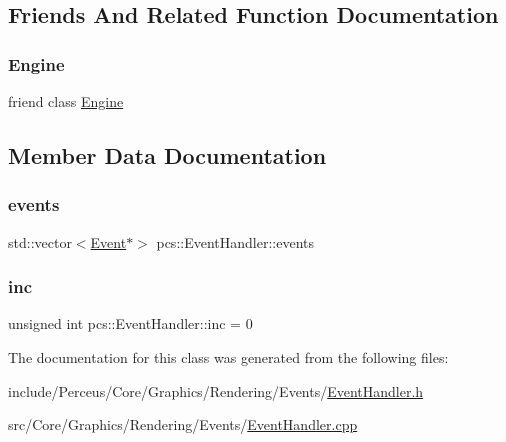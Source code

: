\subsection{Friends And Related Function Documentation}
\mbox{\label{classpcs_1_1EventHandler_a3e1914489e4bed4f9f23cdeab34a43dc}} 
\subsubsection{\texorpdfstring{Engine}{Engine}}
{\footnotesize\ttfamily friend class \hyperlink{classpcs_1_1Engine}{Engine}\hspace{0.3cm}{\ttfamily [friend]}}



\subsection{Member Data Documentation}
\mbox{\label{classpcs_1_1EventHandler_a05bd1c27d4ee1082c31fcaf767a43939}} 
\subsubsection{\texorpdfstring{events}{events}}
{\footnotesize\ttfamily std\+::vector$<$\hyperlink{classpcs_1_1Event}{Event}$\ast$$>$ pcs\+::\+Event\+Handler\+::events\hspace{0.3cm}{\ttfamily [private]}}

\mbox{\label{classpcs_1_1EventHandler_a31eccb3a5277a000785059cb34b31fd1}} 
\subsubsection{\texorpdfstring{inc}{inc}}
{\footnotesize\ttfamily unsigned int pcs\+::\+Event\+Handler\+::inc = 0\hspace{0.3cm}{\ttfamily [private]}}



The documentation for this class was generated from the following files\+:\begin{DoxyCompactItemize}
\item 
include/\+Perceus/\+Core/\+Graphics/\+Rendering/\+Events/\hyperlink{EventHandler_8h}{Event\+Handler.\+h}\item 
src/\+Core/\+Graphics/\+Rendering/\+Events/\hyperlink{EventHandler_8cpp}{Event\+Handler.\+cpp}\end{DoxyCompactItemize}
